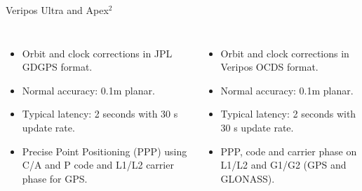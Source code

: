\documentclass[11pt]{beamer}
\begin{document}
\begin{frame}{Veripos Ultra and Apex$^2$} %
	\begin{columns}[T,onlytextwidth]
		\begin{itemize}	
			\item Orbit and clock corrections in JPL GDGPS format.
			\item Normal accuracy: 0.1m planar. 
			\item Typical latency: 2 seconds with 30 s update rate.%
			\item Precise Point Positioning (PPP) using C/A and P code and L1/L2 carrier phase for GPS.
		\end{itemize}	
			\begin{itemize}	
			\item Orbit and clock corrections in Veripos OCDS format.
			\item Normal accuracy: 0.1m planar. 
			\item Typical latency: 2 seconds with 30 s update rate.%
			\item PPP, code and carrier phase on L1/L2 and G1/G2 (GPS and GLONASS).
			\end{itemize}	
	\end{columns}
\end{frame}
\end{document}
